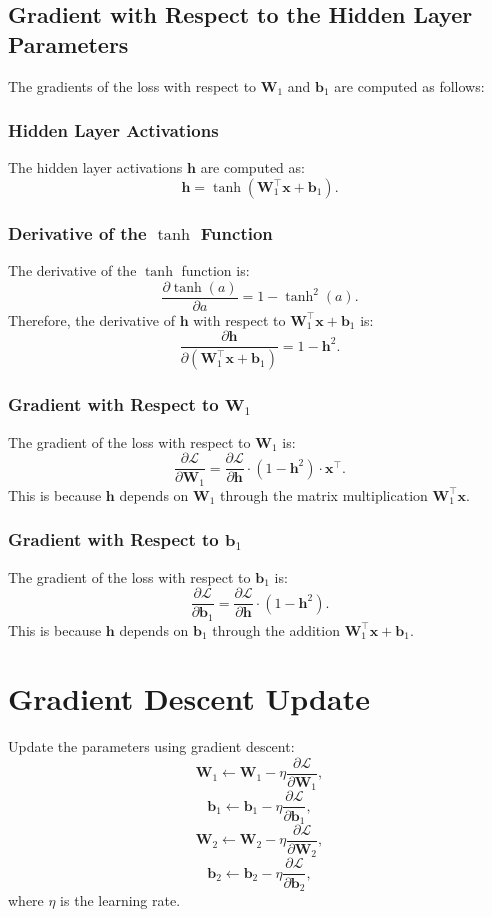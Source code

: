 \begin{notechapter}
\subsection{Gradient with Respect to the Hidden Layer Parameters}
The gradients of the loss with respect to \(\mathbf{W}_1\) and \(\mathbf{b}_1\)
are computed as follows:

\subsubsection{Hidden Layer Activations}
The hidden layer activations \(\mathbf{h}\) are computed as:
\[
\mathbf{h} = \tanh(\mathbf{W}_1^\top \mathbf{x} + \mathbf{b}_1).
\]

\subsubsection{Derivative of the \(\tanh\) Function}
The derivative of the \(\tanh\) function is:
\[
\frac{\partial \tanh(a)}{\partial a} = 1 - \tanh^2(a).
\]
Therefore, the derivative of \(\mathbf{h}\) with respect to
\(\mathbf{W}_1^\top \mathbf{x} + \mathbf{b}_1\) is:
\[
\frac{\partial \mathbf{h}}{\partial (\mathbf{W}_1^\top \mathbf{x} + \mathbf{b}_1)} = 1 - \mathbf{h}^2.
\]

\subsubsection{Gradient with Respect to \(\mathbf{W}_1\)}
The gradient of the loss with respect to \(\mathbf{W}_1\) is:
\[
\frac{\partial \mathcal{L}}{\partial \mathbf{W}_1} =
\frac{\partial \mathcal{L}}{\partial \mathbf{h}} \cdot (1 - \mathbf{h}^2) \cdot \mathbf{x}^\top.
\]
This is because \(\mathbf{h}\) depends on \(\mathbf{W}_1\) through the matrix
multiplication \(\mathbf{W}_1^\top \mathbf{x}\).

\subsubsection{Gradient with Respect to \(\mathbf{b}_1\)}
The gradient of the loss with respect to \(\mathbf{b}_1\) is:
\[
\frac{\partial \mathcal{L}}{\partial \mathbf{b}_1} =
\frac{\partial \mathcal{L}}{\partial \mathbf{h}} \cdot (1 - \mathbf{h}^2).
\]
This is because \(\mathbf{h}\) depends on \(\mathbf{b}_1\) through the addition
\(\mathbf{W}_1^\top \mathbf{x} + \mathbf{b}_1\).

\section{Gradient Descent Update}
Update the parameters using gradient descent:
\[
\mathbf{W}_1 \leftarrow \mathbf{W}_1 - \eta \frac{\partial \mathcal{L}}{\partial \mathbf{W}_1},
\]
\[
\mathbf{b}_1 \leftarrow \mathbf{b}_1 - \eta \frac{\partial \mathcal{L}}{\partial \mathbf{b}_1},
\]
\[
\mathbf{W}_2 \leftarrow \mathbf{W}_2 - \eta \frac{\partial \mathcal{L}}{\partial \mathbf{W}_2},
\]
\[
\mathbf{b}_2 \leftarrow \mathbf{b}_2 - \eta \frac{\partial \mathcal{L}}{\partial \mathbf{b}_2},
\]
where \(\eta\) is the learning rate.


\end{notechapter}
